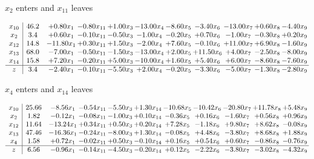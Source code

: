 \documentclass[9pt]{article}
\begin{document}
 $ x_{2} $ enters and $ x_{11} $ leaves 

 \[\begin{array}{c| c c@{\hskip 2pt} c@{\hskip 2pt} c@{\hskip 2pt} c@{\hskip 2pt} c@{\hskip 2pt} c@{\hskip 2pt} c@{\hskip 2pt} c@{\hskip 2pt} c@{\hskip 2pt} }
 x_{10}   &  46.2 & +  0.80 x_{1} & -0.80 x_{11} & +  1.00 x_{3} & -13.00 x_{4} & -8.60 x_{5} & -3.40 x_{6} & -13.00 x_{7} & +  0.60 x_{8} & -4.40 x_{9}\\
 x_{2}   &  3.4 & +  0.60 x_{1} & -0.10 x_{11} & -0.50 x_{3} & -1.00 x_{4} & -0.20 x_{5} & +  0.70 x_{6} & -1.00 x_{7} & -0.30 x_{8} & +  0.20 x_{9}\\
 x_{12}   &  14.8 & -11.80 x_{1} & +  0.30 x_{11} & +  1.50 x_{3} & -2.00 x_{4} & +  7.60 x_{5} & -0.10 x_{6} & + 11.00 x_{7} & +  6.90 x_{8} & -1.60 x_{9}\\
 x_{13}   &  68.0 & -7.00 x_{1} & -0.50 x_{11} & -1.50 x_{3} & -13.00 x_{4} & +  2.00 x_{5} & + 11.50 x_{6} & +  4.00 x_{7} & -2.50 x_{8} & -8.00 x_{9}\\
 x_{14}   &  15.8 & +  7.20 x_{1} & -0.20 x_{11} & +  5.00 x_{3} & -10.00 x_{4} & +  1.60 x_{5} & +  5.40 x_{6} & +  6.00 x_{7} & -8.60 x_{8} & -7.60 x_{9}\\
\hline
z    &  3.4 & -2.40 x_{1} & -0.10 x_{11} & -5.50 x_{3} & +  2.00 x_{4} & -0.20 x_{5} & -3.30 x_{6} & -5.00 x_{7} & -1.30 x_{8} & -2.80 x_{9}\\
\end{array}\]


 $ x_{4} $ enters and $ x_{14} $ leaves 

 \[\begin{array}{c| c c@{\hskip 2pt} c@{\hskip 2pt} c@{\hskip 2pt} c@{\hskip 2pt} c@{\hskip 2pt} c@{\hskip 2pt} c@{\hskip 2pt} c@{\hskip 2pt} c@{\hskip 2pt} }
 x_{10}   &  25.66 & -8.56 x_{1} & -0.54 x_{11} & -5.50 x_{3} & +  1.30 x_{14} & -10.68 x_{5} & -10.42 x_{6} & -20.80 x_{7} & + 11.78 x_{8} & +  5.48 x_{9}\\
 x_{2}   &  1.82 & -0.12 x_{1} & -0.08 x_{11} & -1.00 x_{3} & +  0.10 x_{14} & -0.36 x_{5} & +  0.16 x_{6} & -1.60 x_{7} & +  0.56 x_{8} & +  0.96 x_{9}\\
 x_{12}   &  11.64 & -13.24 x_{1} & +  0.34 x_{11} & +  0.50 x_{3} & +  0.20 x_{14} & +  7.28 x_{5} & -1.18 x_{6} & +  9.80 x_{7} & +  8.62 x_{8} & -0.08 x_{9}\\
 x_{13}   &  47.46 & -16.36 x_{1} & -0.24 x_{11} & -8.00 x_{3} & +  1.30 x_{14} & -0.08 x_{5} & +  4.48 x_{6} & -3.80 x_{7} & +  8.68 x_{8} & +  1.88 x_{9}\\
 x_{4}   &  1.58 & +  0.72 x_{1} & -0.02 x_{11} & +  0.50 x_{3} & -0.10 x_{14} & +  0.16 x_{5} & +  0.54 x_{6} & +  0.60 x_{7} & -0.86 x_{8} & -0.76 x_{9}\\
\hline
z    &  6.56 & -0.96 x_{1} & -0.14 x_{11} & -4.50 x_{3} & -0.20 x_{14} & +  0.12 x_{5} & -2.22 x_{6} & -3.80 x_{7} & -3.02 x_{8} & -4.32 x_{9}\\
\end{array}\]
\end{document}
